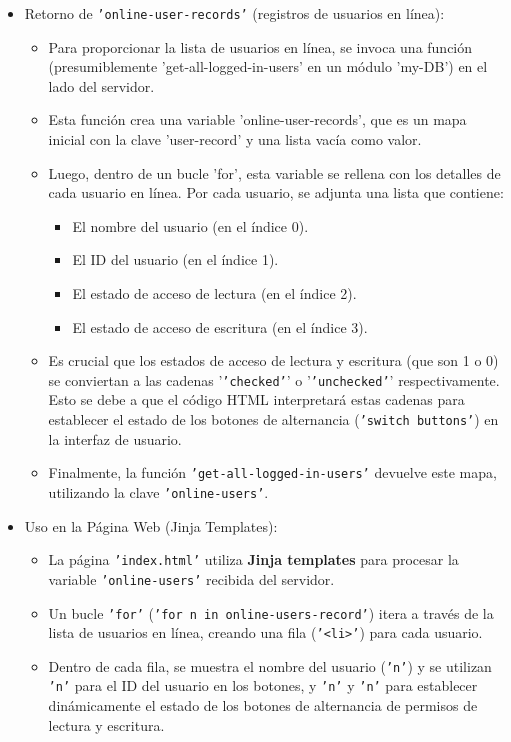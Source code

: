 \documentclass{report}
\begin{document}
\begin{itemize}
    \item Retorno de \texttt{'online-user-records'} (registros de usuarios en línea):
        \begin{itemize}
            \item Para proporcionar la lista de usuarios en línea, se invoca una función (presumiblemente 'get-all-logged-in-users' en un módulo 'my-DB') 
            en el lado del servidor.
            \item Esta función crea una variable 'online-user-records', que es un mapa inicial con la clave 'user-record' y una lista vacía como valor.
            \item Luego, dentro de un bucle 'for', esta variable se  rellena  con los detalles de cada usuario en línea. Por cada usuario, se adjunta una 
            lista que contiene:
                \begin{itemize}
                    \item El nombre del usuario (en el índice 0).
                    \item El ID del usuario (en el índice 1).
                    \item El estado de acceso de lectura (en el índice 2).
                    \item El estado de acceso de escritura (en el índice 3).                
                \end{itemize}
            \item Es crucial que los estados de acceso de lectura y escritura (que son 1 o 0) se conviertan a las cadenas '\texttt{'checked'}' o 
            '\texttt{'unchecked'}' respectivamente. Esto se debe a que el código HTML interpretará estas cadenas para establecer el estado de los botones 
            de alternancia (\texttt{'switch buttons'}) en la interfaz de usuario.
            \item Finalmente, la función \texttt{'get-all-logged-in-users'} devuelve este mapa, utilizando la clave \texttt{'online-users'}.
        \end{itemize}

    \item Uso en la Página Web (Jinja Templates):
        \begin{itemize}
            \item La página \texttt{'index.html'} utiliza \textbf{Jinja templates} para procesar la variable \texttt{'online-users'} recibida del servidor.
            \item Un bucle \texttt{'for'} (\texttt{'for n in online-users-record'}) itera a través de la lista de usuarios en línea, creando una fila 
            (\texttt{'<li>'}) para cada usuario.
            \item Dentro de cada fila, se muestra el nombre del usuario (\texttt{'n'}) y se utilizan \texttt{'n'} para el ID del usuario en los botones, y
            \texttt{'n'} y \texttt{'n'} para establecer dinámicamente el estado de los botones de alternancia de permisos de lectura y escritura.
        \end{itemize}
\end{itemize}
\end{document}
